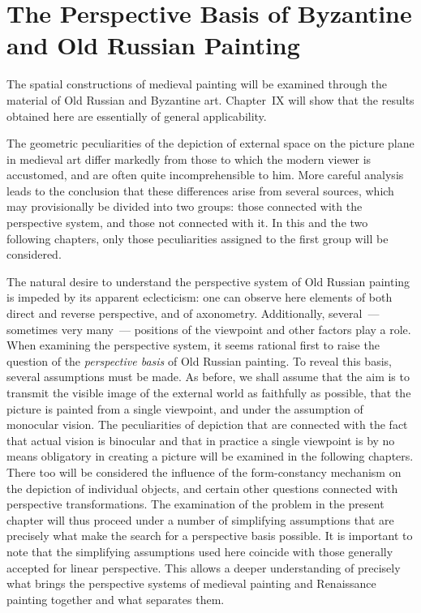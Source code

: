\chapter{The Perspective Basis of Byzantine and Old Russian Painting}


The spatial constructions of medieval painting will be examined through the material of
Old Russian and Byzantine art.  Chapter~IX will show that the results obtained here are
essentially of general applicability.

The geometric peculiarities of the depiction of external space on the picture plane in
medieval art differ markedly from those to which the modern viewer is accustomed, and
are often quite incomprehensible to him.  More careful analysis leads to the conclusion
that these differences arise from several sources, which may provisionally be divided
into two groups: those connected with the perspective system, and those not connected
with it.  In this and the two following chapters, only those peculiarities assigned to the
first group will be considered.

The natural desire to understand the perspective system of Old Russian painting is
impeded by its apparent eclecticism: one can observe here elements of both direct and
reverse perspective, and of axonometry.  Additionally, several~--- sometimes very many~---
positions of the viewpoint and other factors play a role.  When examining the perspective
system, it seems rational first to raise the question of the \emph{perspective basis} of
Old Russian painting.  To reveal this basis, several assumptions must be made.  As
before, we shall assume that the aim is to transmit the visible image of the external
world as faithfully as possible, that the picture is painted from a single viewpoint, and
under the assumption of monocular vision.  The peculiarities of depiction that are
connected with the fact that actual vision is binocular and that in practice a single
viewpoint is by no means obligatory in creating a picture will be examined in the
following chapters.  There too will be considered the influence of the form-constancy
mechanism on the depiction of individual objects, and certain other questions connected
with perspective transformations.  The examination of the problem in the present chapter
will thus proceed under a number of simplifying assumptions that are precisely what
make the search for a perspective basis possible.  It is important to note that the
simplifying assumptions used here coincide with those generally accepted for linear
perspective.  This allows a deeper understanding of precisely what brings the perspective
systems of medieval painting and Renaissance painting together and what separates them.


